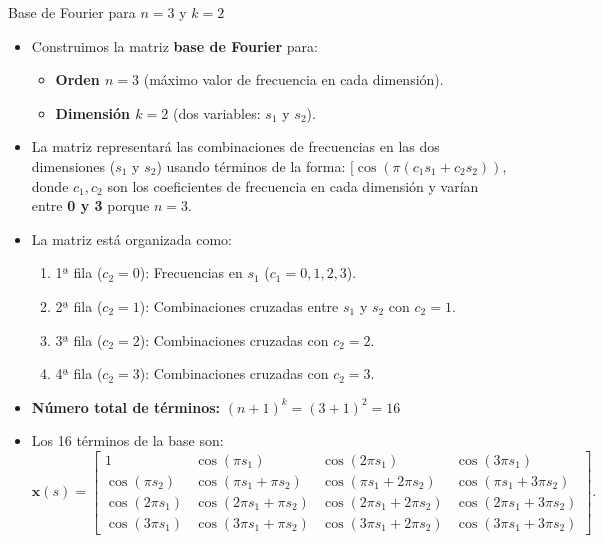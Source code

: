 \documentclass[10pt, envcountsect, handout, aspectratio=1610, hyperref={hypertexnames=true}]{beamer}
\begin{document}
\begin{frame}{Base de Fourier para $n=3$ y $k=2$}
	
	\begin{itemize}
	\item Construimos la matriz  \textbf{base de Fourier} para:  
	\begin{itemize}
		\item \textbf{Orden \( n = 3 \)} (máximo valor de frecuencia en cada dimensión).  
		\item \textbf{Dimensión \( k = 2 \)} (dos variables: \( s_1 \) y \( s_2 \)).  
	\end{itemize}
	
	\item La matriz representará las combinaciones de frecuencias en las dos dimensiones (\( s_1 \) y \( s_2 \)) usando términos de la forma: $[
	\cos\left( \pi (c_1 s_1 + c_2 s_2) \right)
	$, 
	donde \( c_1, c_2 \) son los coeficientes de frecuencia en cada dimensión y varían entre \textbf{0 y 3} porque \( n = 3 \).  
	
	\vspace{0.3cm}
	
	\item La matriz está organizada como:
	\begin{enumerate}
		\item 1ª fila (\( c_2 = 0 \)): Frecuencias en \( s_1 \) (\( c_1 = 0, 1, 2, 3 \)).  
		\item 2ª fila (\( c_2 = 1 \)): Combinaciones cruzadas entre \( s_1 \) y \( s_2 \) con \( c_2 = 1 \).  
		\item 3ª fila (\( c_2 = 2 \)): Combinaciones cruzadas con \( c_2 = 2 \).  
		\item 4ª fila (\( c_2 = 3 \)): Combinaciones cruzadas con \( c_2 = 3 \).  
	\end{enumerate}
	
	\item \textbf{Número total de términos:} $(n+1)^k = (3+1)^2 = 16$
	
	\item Los 16 términos de la base son:
	\[
	\mathbf{x}(s) =
	\begin{bmatrix}
		1 & \cos(\pi s_1) & \cos(2\pi s_1) & \cos(3\pi s_1) \\
		\cos(\pi s_2) & \cos(\pi s_1 + \pi s_2) & \cos(\pi s_1 + 2\pi s_2) & \cos(\pi s_1 + 3\pi s_2) \\
		\cos(2\pi s_1) & \cos(2\pi s_1 + \pi s_2) & \cos(2\pi s_1 + 2\pi s_2) & \cos(2\pi s_1 + 3\pi s_2) \\
		\cos(3\pi s_1) & \cos(3\pi s_1 + \pi s_2) & \cos(3\pi s_1 + 2\pi s_2) & \cos(3\pi s_1 + 3\pi s_2)
	\end{bmatrix}.
	\]
	

\end{itemize}
\end{frame}
\end{document}

